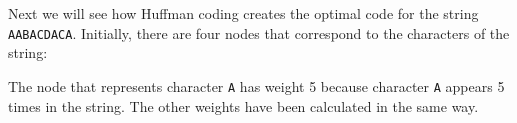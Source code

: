 Next we will see how Huffman coding creates
the optimal code for the string
\texttt{AABACDACA}.
Initially, there are four nodes that correspond
to the characters of the string:

\begin{center}
\end{center}
The node that represents character \texttt{A}
has weight 5 because character \texttt{A}
appears 5 times in the string.
The other weights have been calculated
in the same way.

